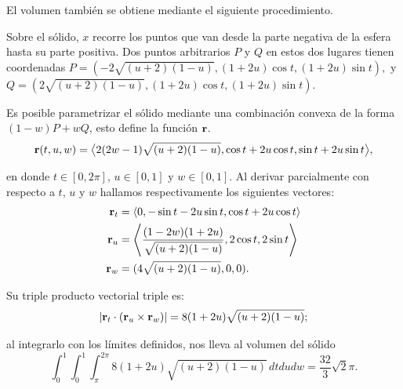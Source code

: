 \begin{tcolorbox}[title=\bf Instrucción en \verb"Mathematica"]
\end{tcolorbox}

\clearpage

El volumen también se obtiene mediante el siguiente procedimiento.


Sobre el sólido, $x$ recorre los puntos que van desde la parte negativa de la esfera hasta su parte positiva. Dos puntos arbitrarios
$P$ y $Q$ en estos dos lugares tienen coordenadas
$P=(-2\sqrt{( u+2)( 1-u) },(1+2u)\cos t,(1+2u)\sin t), \,\, \text{y} $
$Q=(2\sqrt{( u+2) ( 1-u) },(1+2u)\cos t,(1+2u)\sin t)$.

Es posible parametrizar el sólido mediante una combinación convexa de la forma $(1-w)P+wQ$, esto define la función ${\bf r}$.
\begin{gather*}
{\bf r}(t,u,w) = \big \langle 2( 2w-1) \sqrt{( u+2)( 1-u) },\cos t+2u\cos t, \sin t+2u\sin t \big \rangle,
\end{gather*}

en donde $t \in [0,2\pi]$, $u \in [0,1]$ y $w \in [0,1]$.
Al derivar parcialmente con respecto a $t$, $u$ y $w$ hallamos respectivamente los siguientes vectores:
\begin{align*}
{\bf r}_{t} &= \langle 0,-\sin t-2u\sin t,\cos t+2u\cos t\rangle \\
{\bf r}_{u} &= \left \langle \frac{( 1-2w)( 1+2u)}{\sqrt{( u+2) ( 1-u) }},2\cos t,2\sin t\right \rangle \\
{\bf r}_{w} &= ( 4\sqrt{( u+2) ( 1-u) },0,0).
\end{align*}

Su triple producto vectorial triple es:
\[|{\bf r}_{t}\cdot({\bf r}_{u}\times{\bf r}_{w})|=8(1+2u)\sqrt{(u+2)(1-u)};\]

al integrarlo con los límites definidos, nos lleva al volumen del sólido
\[\int_{0}^{1}\int_{0}^{1}\int_{\pi}^{2\pi}8(1+2u)\sqrt{(u+2)(1-u)}\,dtdudw=\frac{32}{3}\sqrt{2}\pi.\]


